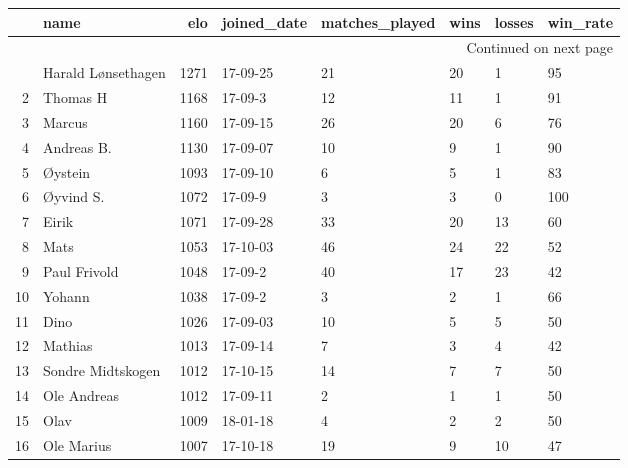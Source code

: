 \begin{longtable}{|r|l|r|l|l|l|l|l|}
\toprule
{} &                 name &   elo & joined\_date &  matches\_played &  wins &  losses &  win\_rate \\
\midrule
\endhead
\midrule
\multicolumn{8}{r}{{Continued on next page}} \\
\midrule
\endfoot

\bottomrule
\endlastfoot
1  &   Harald Lønsethagen &  1271 &    17-09-25 &              21 &    20 &       1 &        95 \\
2  &             Thomas H &  1168 &     17-09-3 &              12 &    11 &       1 &        91 \\
3  &               Marcus &  1160 &    17-09-15 &              26 &    20 &       6 &        76 \\
4  &           Andreas B. &  1130 &    17-09-07 &              10 &     9 &       1 &        90 \\
5  &              Øystein &  1093 &    17-09-10 &               6 &     5 &       1 &        83 \\
6  &            Øyvind S. &  1072 &     17-09-9 &               3 &     3 &       0 &       100 \\
7  &                Eirik &  1071 &    17-09-28 &              33 &    20 &      13 &        60 \\
8  &                 Mats &  1053 &    17-10-03 &              46 &    24 &      22 &        52 \\
9  &         Paul Frivold &  1048 &     17-09-2 &              40 &    17 &      23 &        42 \\
10 &               Yohann &  1038 &     17-09-2 &               3 &     2 &       1 &        66 \\
11 &                 Dino &  1026 &    17-09-03 &              10 &     5 &       5 &        50 \\
12 &              Mathias &  1013 &    17-09-14 &               7 &     3 &       4 &        42 \\
13 &    Sondre Midtskogen &  1012 &    17-10-15 &              14 &     7 &       7 &        50 \\
14 &          Ole Andreas &  1012 &    17-09-11 &               2 &     1 &       1 &        50 \\
15 &                 Olav &  1009 &    18-01-18 &               4 &     2 &       2 &        50 \\
16 &           Ole Marius &  1007 &    17-10-18 &              19 &     9 &      10 &        47 \\

\end{longtable}
